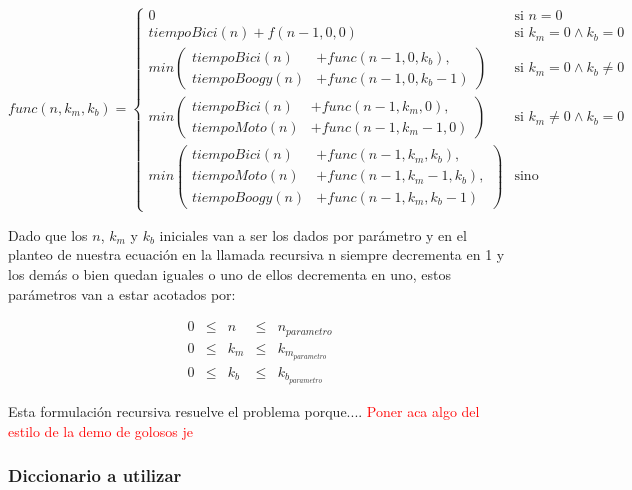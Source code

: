 \begin{equation*}
func(n, k_m, k_b) = 
\begin{cases} 
       0  & \mbox{si } n = 0  \\[2ex]
       tiempoBici(n) + f(n-1, 0, 0)  & \mbox{si } k_m=0 \wedge k_b=0 \\[2ex]
      min \left(
      \begin{split}
       tiempoBici(n) & + func(n-1, 0, k_b) , \\
       tiempoBoogy(n) & + func(n-1, 0, k_b-1)
\end{split} \right) & \mbox{si } k_m=0 \wedge k_b\neq0 \\[3ex]
      min \left(
      \begin{split}
       tiempoBici(n) & + func(n-1, k_m, 0) , \\
       tiempoMoto(n) & + func(n-1, k_m-1, 0)
\end{split} \right) & \mbox{si } k_m\neq0 \wedge k_b=0 \\[3ex]
           min \left(
      \begin{split}
       tiempoBici(n) & + func(n-1, k_m, k_b) , \\
       tiempoMoto(n) & + func(n-1, k_m-1, k_b) , \\
       tiempoBoogy(n) & + func(n-1, k_m, k_b-1)
\end{split} \right) & \mbox{sino}
\end{cases} 
\end{equation*}

Dado que los $n$, $k_m$ y $k_b$ iniciales van a ser los dados por par\'ametro y en el planteo de nuestra ecuaci\'on en la llamada recursiva n siempre decrementa en 1 y los dem\'as o bien quedan iguales o uno de ellos decrementa en uno, estos par\'ametros van a estar acotados por:

\begin{equation*}
\begin{array}{lllll}
0 & \leq & n &\leq & n_{parametro} \\
0 & \leq & k_m & \leq & k_{m_{parametro}} \\
0 & \leq & k_b & \leq & k_{b_{parametro}}
\end{array}
\end{equation*}

\newpage
Esta formulaci\'on recursiva resuelve el problema porque.... \textcolor{red}{Poner aca algo del estilo de la demo de golosos je}\\

\subsubsection*{Diccionario a utilizar}

